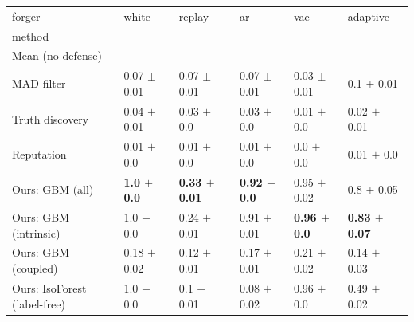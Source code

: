 \begin{tabular}{llllll}
\toprule
forger & white & replay & ar & vae & adaptive \\
method &  &  &  &  &  \\
\midrule
Mean (no defense) & -- & -- & -- & -- & -- \\
MAD filter & 0.07 $\pm$ 0.01 & 0.07 $\pm$ 0.01 & 0.07 $\pm$ 0.01 & 0.03 $\pm$ 0.01 & 0.1 $\pm$ 0.01 \\
Truth discovery & 0.04 $\pm$ 0.01 & 0.03 $\pm$ 0.0 & 0.03 $\pm$ 0.0 & 0.01 $\pm$ 0.0 & 0.02 $\pm$ 0.01 \\
Reputation & 0.01 $\pm$ 0.0 & 0.01 $\pm$ 0.0 & 0.01 $\pm$ 0.0 & 0.0 $\pm$ 0.0 & 0.01 $\pm$ 0.0 \\
Ours: GBM (all) & \textbf{1.0 $\pm$ 0.0} & \textbf{0.33 $\pm$ 0.01} & \textbf{0.92 $\pm$ 0.0} & 0.95 $\pm$ 0.02 & 0.8 $\pm$ 0.05 \\
Ours: GBM (intrinsic) & 1.0 $\pm$ 0.0 & 0.24 $\pm$ 0.01 & 0.91 $\pm$ 0.01 & \textbf{0.96 $\pm$ 0.0} & \textbf{0.83 $\pm$ 0.07} \\
Ours: GBM (coupled) & 0.18 $\pm$ 0.02 & 0.12 $\pm$ 0.01 & 0.17 $\pm$ 0.01 & 0.21 $\pm$ 0.02 & 0.14 $\pm$ 0.03 \\
Ours: IsoForest (label-free) & 1.0 $\pm$ 0.0 & 0.1 $\pm$ 0.01 & 0.08 $\pm$ 0.02 & 0.96 $\pm$ 0.0 & 0.49 $\pm$ 0.02 \\
\bottomrule
\end{tabular}

